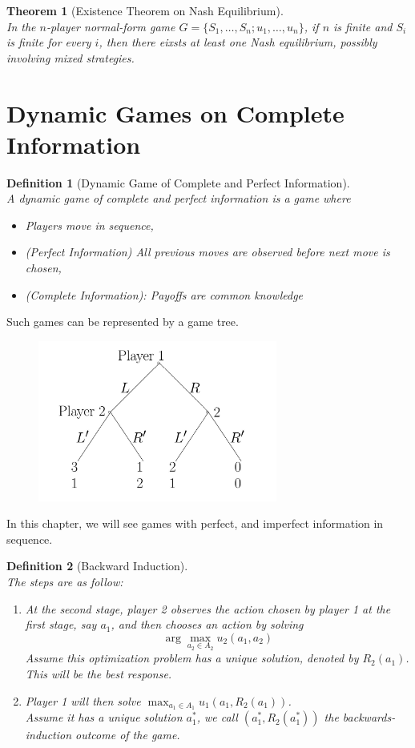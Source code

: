 \documentclass[12pt]{article}
\newtheorem{definition}{Definition}[section]
\newtheorem{theorem}{Theorem}[section]
\theoremstyle{definition}
\begin{document}
\begin{theorem}[Existence Theorem on Nash Equilibrium]
\hfill\\\normalfont In the $n$-player normal-form game $G=\{S_1,\ldots, S_n; u_1,\ldots, u_n\}$, if $n$ is \textit{finite} and $S_i$ is \textit{finite} for every $i$, then there eixsts at least one Nash equilibrium, possibly involving mixed strategies.
\end{theorem}
\clearpage
\section{Dynamic Games on Complete Information}
\begin{definition}[Dynamic Game of Complete and Perfect Information]
\hfill\\\normalfont A dynamic game of complete and perfect information is a game where
\begin{itemize}
  \item Players move in sequence, 
  \item (Perfect Information) All previous moves are observed before next move is chosen,
  \item (Complete Information): Payoffs are common knowledge
\end{itemize}
\end{definition}
Such games can be represented by a game tree.\\
\begin{figure}[h]
\centering
\includegraphics[width=0.7\textwidth]{2-1.jpg}
\end{figure}
In this chapter, we will see games with perfect, and imperfect information in sequence.
\begin{definition}[Backward Induction]
\hfill\\\normalfont The steps are as follow:
\begin{enumerate}
  \item At the second stage, player 2 observes the action chosen by player 1 at the first stage, say $a_1$, and then chooses an action by solving 
  \[
\arg \max_{a_2\in A_2} u_2(a_1, a_2)
  \]
  Assume this optimization problem has a unique solution, denoted by $R_2(a_1)$. This will be the best response.
  \item Player 1 will then solve $\max_{a_1\in A_1}u_1(a_1, R_2(a_1))$.\\
  Assume it has a unique solution $a_1^\ast$, we call $(a_1^\ast, R_2(a_1^\ast))$ the backwards-induction outcome of the game.
\end{enumerate}
\end{definition}
\end{document}
